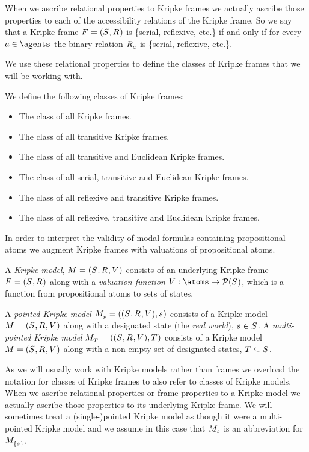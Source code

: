 When we ascribe relational properties to Kripke frames we actually ascribe those properties to each of the accessibility relations of the Kripke frame.
So we say that a Kripke frame $\kFrameAndTuple$ is \{serial, reflexive, etc.\} if and only if for every $\agentA \in \agents$ the binary relation $\kAccessibilityA$ is \{serial, reflexive, etc.\}.

We use these relational properties to define the classes of Kripke frames that we will be working with.

\begin{definition}
We define the following classes of Kripke frames:
\begin{itemize}
    \item The class \classK{} of all Kripke frames.
    \item The class \classKF{} of all transitive Kripke frames.
    \item The class \classKFF{} of all transitive and Euclidean Kripke frames.
    \item The class \classKD{} of all serial, transitive and Euclidean Kripke frames.
    \item The class \classSF{} of all reflexive and transitive Kripke frames.
    \item The class \classS{} of all reflexive, transitive and Euclidean Kripke frames.
\end{itemize}
\end{definition}

In order to interpret the validity of modal formulas containing propositional atoms we augment Kripke frames with valuations of propositional atoms.

\begin{definition}
A {\em Kripke model}, $\kModelAndTuple$ consists of an underlying Kripke frame $\kFrameAndTuple$ along with a {\em valuation function} $\kValuation : \atoms \to \powerset(\kStates)$, which is a function from propositional atoms to sets of states.

A {\em pointed Kripke model} $\kPModelAndTuple{\kStateS}$ consists of a Kripke model $\kModelAndTuple$ along with a designated state (the {\em real world}), $\kStateS \in \kStates$.
A {\em multi-pointed Kripke model} $\kPModelAndTuple{\kStatesT}$ consists of a Kripke model $\kModelAndTuple$ along with a non-empty set of designated states, $\kStatesT \subseteq \kStates$.
\end{definition}

As we will usually work with Kripke models rather than frames we overload the notation for classes of Kripke frames to also refer to classes of Kripke models.
When we ascribe relational properties or frame properties to a Kripke model we actually ascribe those properties to its underlying Kripke frame.
We will sometimes treat a (single-)pointed Kripke model as though it were a multi-pointed Kripke model and we assume in this case that $\kPModel{\kStateS}$ is an abbreviation for $\kPModel{\{\kStateS\}}$.

